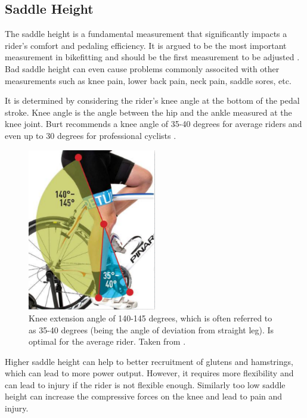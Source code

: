 \subsection{Saddle Height}
The saddle height is a fundamental measurement that significantly impacts a rider's comfort and pedaling efficiency. It is argued to be the most important measurement in bikefitting and should be the first measurement to be adjusted \cite{burtbikefit}. Bad saddle height can even cause problems commonly associted with other measurements such as knee pain, lower back pain, neck pain, saddle sores, etc.

It is determined by considering the rider's knee angle at the bottom of the pedal stroke. Knee angle is the angle between the hip and the ankle measured at the knee joint. Burt recommends a knee angle of 35-40 degrees for average riders and even up to 30 degrees for professional cyclists \cite{burtbikefit}.

\begin{figure}[htbp]
    \centering
    \includegraphics[width=0.5\textwidth]{obrazky-figures/burt_knee_angle.png}
    \caption{Knee extension angle of 140-145 degrees, which is often referred to as 35-40 degrees (being the angle of deviation from straight leg). Is optimal for the average rider. Taken from \cite{burtbikefit}.}
    \label{fig:saddle_height}
\end{figure}



Higher saddle height can help to better recruitment of glutens and hamstrings, which can lead to more power output. However, it requires more flexibility and can lead to injury if the rider is not flexible enough. Similarly too low saddle height can increase the compressive forces on the knee and lead to pain and injury.

